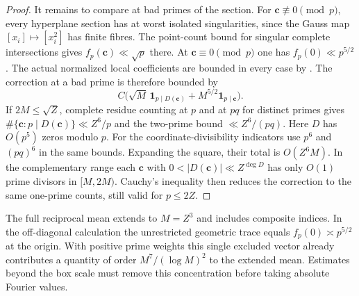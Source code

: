 \documentclass[11pt,letterpaper]{article}
\theoremstyle{definition}
\begin{document}
\begin{proof}
It remains to compare at bad primes of the section. For
$\mathbf c\not\equiv0\pmod p$, every hyperplane section has at worst
isolated singularities, since the Gauss map
$[x_i]\mapsto[x_i^2]$ has finite fibres. The point-count bound for
singular complete intersections \cite{c3:hooleysingular} gives
$f_p(\mathbf c)\ll\sqrt p$ there. At $\mathbf c\equiv0\pmod p$
one has $f_p(0)\ll p^{5/2}$. The actual normalized local
coefficients are bounded in every case by \cite[(3.2)--(3.3)]{c3:wang}.
The correction at a bad prime is therefore bounded by
\[
 C\big(\sqrt M\,\mathbf1_{p\mid D(\mathbf c)}
              +M^{5/2}\mathbf1_{p\mid\mathbf c}\big).
\]
If $2M\le\sqrt Z$, complete residue counting at $p$ and at $pq$
for distinct primes gives
$\#\{\mathbf c:p\mid D(\mathbf c)\}\ll Z^6/p$ and the two-prime
bound $\ll Z^6/(pq)$. Here $D$ has $O(p^5)$ zeros modulo $p$.
For the coordinate-divisibility indicators use $p^6$ and
$(pq)^6$ in the same bounds. Expanding the square, their total is
$O(Z^6M)$. In the complementary range each $\mathbf c$ with
$0<|D(\mathbf c)|\ll Z^{\deg D}$ has only $O(1)$ prime divisors
in $[M,2M)$. Cauchy's inequality then reduces the correction to the
same one-prime counts, still valid for $p\le2Z$.
\end{proof}
The full reciprocal mean extends to $M=Z^3$ and includes composite
indices. In the off-diagonal calculation the unrestricted geometric
trace equals $f_p(0)\asymp p^{5/2}$ at the origin. With positive
prime weights this single excluded vector already contributes a
quantity of order $M^7/(\log M)^2$ to the extended mean. Estimates
beyond the box scale must remove this concentration before taking
absolute Fourier values.
\end{document}
